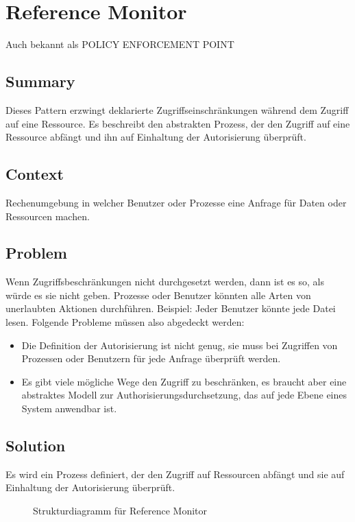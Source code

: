 \chapter{Reference Monitor}

Auch bekannt als POLICY ENFORCEMENT POINT

\section{Summary}
Dieses Pattern erzwingt deklarierte Zugriffseinschränkungen während dem Zugriff auf eine Ressource. Es beschreibt den abstrakten Prozess, der den Zugriff auf eine Ressource abfängt und ihn auf Einhaltung der Autorisierung überprüft.

\section{Context}
Rechenumgebung in welcher Benutzer oder Prozesse eine Anfrage für Daten oder Ressourcen machen.

\section{Problem}
Wenn Zugriffsbeschränkungen nicht durchgesetzt werden, dann ist es so, als würde es sie nicht geben. Prozesse oder Benutzer könnten alle Arten von unerlaubten Aktionen durchführen. Beispiel: Jeder Benutzer könnte jede Datei lesen.  Folgende Probleme müssen also abgedeckt werden:
\begin{itemize}
  \item Die Definition der Autorisierung ist nicht genug, sie muss bei Zugriffen von Prozessen oder Benutzern für jede Anfrage überprüft werden.
  \item Es gibt viele mögliche Wege den Zugriff zu beschränken, es braucht aber eine abstraktes Modell zur Authorisierungsdurchsetzung, das auf jede Ebene eines System anwendbar ist.
\end{itemize}

\section{Solution}
Es wird ein Prozess definiert, der den Zugriff auf Ressourcen abfängt und sie auf Einhaltung der Autorisierung überprüft.

\begin{figure}[H]
  \centering
  
  \caption{Strukturdiagramm f\"ur Reference Monitor}
\end{figure}

